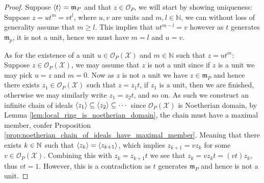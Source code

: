 \begin{proof}
  Suppose $\langle t\rangle = \mathfrak{m}_P$ and that $z \in \mathcal{O}_{P}$, we will start by showing uniqueness: Suppose $z = ut^m = v t^l$, where $u, v$ are units and $m, l \in \mathbb{N}$, we can without loss of generality assume that $m \geq l$. This implies that $u  t^{m - l} = v$ however as $t$ generates $\mathfrak{m}_{p}$, it is not a unit, hence we must have $m = l$ and $u = v$.

  As for the existence of a unit $u \in \mathcal{O}_{P}(\mathcal{X})$ and $m \in \mathbb{N}$ such that $z = u t^{m}$: Suppose $z \in \mathcal{O}_{P}(\mathcal{X})$, we may assume that $z$ is not a unit since if $z$ is a unit we may pick $u = z$ and $m = 0$. Now as $z$ is not a unit we have $z \in \mathfrak{m}_{P}$ and hence there exists $z_{1} \in \mathcal{O}_{P}(\mathcal{X})$ such that $z = z_{1} t$, if $z_{1}$ is a unit, then we are finished, otherwise we may similarly write $z_{1} = z_{2} t$, and so on. As such we construct an infinite chain of ideals $\langle z_{1}\rangle \subseteq \langle z_{2}\rangle \subseteq \cdots$ since $\mathcal{O}_{P}(\mathcal{X})$ is Noetherian domain, by Lemma \ref{lem:local_ring_is_noetherian_domain}, the chain must have a maximal member, confer Proposition \ref{prop:noetherian_chain_of_ideals_have_maximal_member}. Meaning that there exists $k \in \mathbb{N}$ such that $\langle z_{k}\rangle = \langle z_{k +1}\rangle$, which implies $z_{k + 1} = v z_{k}$ for some $v \in \mathcal{O}_{P}(\mathcal{X})$. Combining this with $z_{k} =  z_{k + 1}t$ we see that $z_{k} = v z_{k} t = (vt) z_{k}$, thus $vt = 1$. However, this is a contradiction as $t$ generates $\mathfrak{m}_{P}$ and hence is not a unit.
\end{proof}
